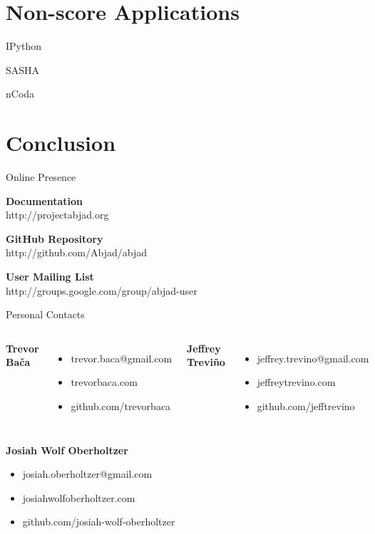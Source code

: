 \documentclass[10pt]{beamer}
\begin{document}
\section{Non-score Applications}

\begin{frame}{IPython}
\end{frame}

\begin{frame}{SASHA}
\end{frame}

\begin{frame}{nCoda}
\end{frame}

\section{Conclusion}

\begin{frame}{Online Presence}

\textbf{Documentation} \\
http://projectabjad.org

\vfill{}

\textbf{GitHub Repository} \\
http://github.com/Abjad/abjad

\vfill{}

\textbf{User Mailing List} \\
http://groups.google.com/group/abjad-user

\end{frame}

\begin{frame}{Personal Contacts}
    \begin{columns}[t,onlytextwidth]
        \textbf{Trevor Ba\v{c}a}
        \begin{itemize}
            \item trevor.baca@gmail.com
            \item trevorbaca.com
            \item github.com/trevorbaca
        \end{itemize}
        \textbf{Jeffrey Trevi\~{n}o}
        \begin{itemize}
            \item jeffrey.trevino@gmail.com
            \item jeffreytrevino.com
            \item github.com/jefftrevino
        \end{itemize}
    \end{columns}
    \vspace{\baselineskip}
    \textbf{Josiah Wolf Oberholtzer}
    \begin{itemize}
        \item josiah.oberholtzer@gmail.com
        \item josiahwolfoberholtzer.com
        \item github.com/josiah-wolf-oberholtzer
    \end{itemize}
\end{frame}
\end{document}
